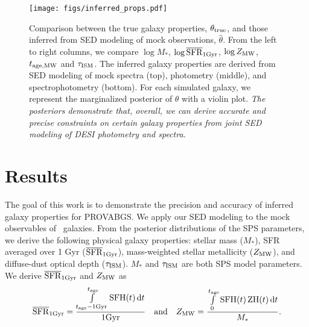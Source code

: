 \begin{figure}
\begin{center}
\texttt{[image: figs/inferred\_props.pdf]}
\caption{
    Comparison between the true galaxy properties, $\theta_{\rm true}$, and
    those inferred from SED modeling of mock observations, $\hat{\theta}$. 
    From the left to right columns, we compare $\log M_*$, $\log \overline{\rm SFR}_{\rm 1Gyr}$, 
    $\log Z_{\rm MW}$, $t_{\rm age, MW}$ and $\tau_{\rm ISM}$. 
    The inferred galaxy properties are derived from SED modeling of mock
    spectra (top), photometry (middle), and spectrophotometry (bottom). 
    For each simulated galaxy, we represent the marginalized posterior of
    $\theta$ with a violin plot.  %
    \emph{The posteriors demonstrate that, overall, we can derive accurate and 
    precise constraints on certain galaxy properties from joint SED modeling of
    DESI photometry and spectra.}
    } \label{fig:prop_inf}
\end{center}
\end{figure}

\section{Results} \label{sec:results}
The goal of this work is to demonstrate the precision and accuracy of inferred
galaxy properties for PROVABGS. 
We apply our SED modeling to the mock observables of  \lgal~galaxies.
From the posterior distributions of the SPS parameters, we derive the following
physical galaxy properties: stellar mass ($M_*$), SFR averaged over 1 Gyr
($\overline{\rm SFR}_{\rm 1Gyr}$), mass-weighted stellar metallicity ($Z_{\rm MW}$), and diffuse-dust
optical depth ($\tau_{\rm ISM}$).
$M_*$ and $\tau_{\rm ISM}$ are both SPS model parameters. 
We derive $\overline{\rm SFR}_{\rm 1Gyr}$ and $Z_{\rm MW}$ as 
\begin{equation}
    \avgsfr = \frac{\int\limits_{t_{\rm age} - {\rm 1 Gyr}}^{t_{\rm age}}{\rm
    SFH}(t)\,{\rm d}t}{{\rm 1 Gyr}} \quad{\rm and}\quad
    Z_{\rm MW} = \frac{\int\limits_0^{t_{\rm age}}{\rm SFH}(t)\,{\rm
    ZH}(t)\,{\rm d}t}{M_*}.
\end{equation} 

